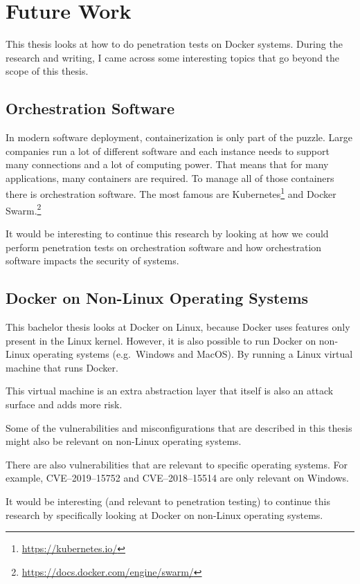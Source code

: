\chapter{Future Work}\label{chapter:futurework}
This thesis looks at how to do penetration tests on Docker systems. During the research and writing, I came across some interesting topics that go beyond the scope of this thesis.

\section{Orchestration Software}
In modern software deployment, containerization is only part of the puzzle. Large companies run a lot of different software and each instance needs to support many connections and a lot of computing power. That means that for many applications, many containers are required. To manage all of those containers there is orchestration software. The most famous are Kubernetes\footnote{\url{https://kubernetes.io/}} and Docker Swarm.\footnote{\url{https://docs.docker.com/engine/swarm/}}

It would be interesting to continue this research by looking at how we could perform penetration tests on orchestration software and how orchestration software impacts the security of systems.

\section{Docker on Non-Linux Operating Systems}
This bachelor thesis looks at Docker on Linux, because Docker uses features only present in the Linux kernel. However, it is also possible to run Docker on non-Linux operating systems (e.g.\ Windows and MacOS). By running a Linux virtual machine that runs Docker.

This virtual machine is an extra abstraction layer that itself is also an attack surface and adds more risk.

\medskip

Some of the vulnerabilities and misconfigurations that are described in this thesis might also be relevant on non-Linux operating systems.

There are also vulnerabilities that are relevant to specific operating systems. For example, CVE--2019--15752 and CVE--2018--15514 are only relevant on Windows.

\medskip

It would be interesting (and relevant to penetration testing) to continue this research by specifically looking at Docker on non-Linux operating systems.

